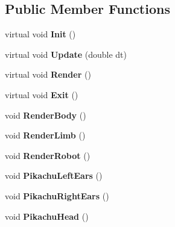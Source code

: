 \subsection*{Public Member Functions}
\begin{DoxyCompactItemize}
\item 
\hypertarget{class_scene_light2_acf5ae067a5c4e6b1b212711e12bac1fd}{virtual void {\bfseries Init} ()}\label{class_scene_light2_acf5ae067a5c4e6b1b212711e12bac1fd}

\item 
\hypertarget{class_scene_light2_ae16bbb986e282708b8d867af762f5503}{virtual void {\bfseries Update} (double dt)}\label{class_scene_light2_ae16bbb986e282708b8d867af762f5503}

\item 
\hypertarget{class_scene_light2_a83a2f8226d9ba88e310291f93675bd81}{virtual void {\bfseries Render} ()}\label{class_scene_light2_a83a2f8226d9ba88e310291f93675bd81}

\item 
\hypertarget{class_scene_light2_a4ac35a541882e7c6a4fb58d377e5860d}{virtual void {\bfseries Exit} ()}\label{class_scene_light2_a4ac35a541882e7c6a4fb58d377e5860d}

\item 
\hypertarget{class_scene_light2_a01a8319e888edf26b7657224d2be426c}{void {\bfseries Render\+Body} ()}\label{class_scene_light2_a01a8319e888edf26b7657224d2be426c}

\item 
\hypertarget{class_scene_light2_aeac4f5e4c09818913af9b5e919b4bdd9}{void {\bfseries Render\+Limb} ()}\label{class_scene_light2_aeac4f5e4c09818913af9b5e919b4bdd9}

\item 
\hypertarget{class_scene_light2_ae69b3a73e15b83537879f3a8c4c79797}{void {\bfseries Render\+Robot} ()}\label{class_scene_light2_ae69b3a73e15b83537879f3a8c4c79797}

\item 
\hypertarget{class_scene_light2_ad028e3d047091e6a3a0c02d93bd9d7e5}{void {\bfseries Pikachu\+Left\+Ears} ()}\label{class_scene_light2_ad028e3d047091e6a3a0c02d93bd9d7e5}

\item 
\hypertarget{class_scene_light2_a567f78942a2f0b385cd4ea1a72fefa86}{void {\bfseries Pikachu\+Right\+Ears} ()}\label{class_scene_light2_a567f78942a2f0b385cd4ea1a72fefa86}

\item 
\hypertarget{class_scene_light2_a9e89035ce2a6cd3e3a054adf67a794b1}{void {\bfseries Pikachu\+Head} ()}\label{class_scene_light2_a9e89035ce2a6cd3e3a054adf67a794b1}


\end{DoxyCompactItemize}
